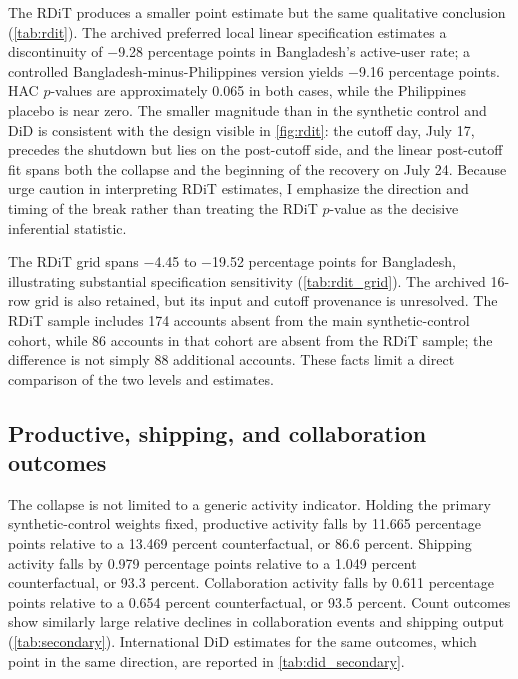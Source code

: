 The RDiT produces a smaller point estimate but the same qualitative conclusion (\cref{tab:rdit}). The archived preferred local linear specification estimates a discontinuity of $-$9.28 percentage points in Bangladesh's active-user rate; a controlled Bangladesh-minus-Philippines version yields $-$9.16 percentage points. HAC $p$-values are approximately 0.065 in both cases, while the Philippines placebo is near zero. The smaller magnitude than in the synthetic control and DiD is consistent with the design visible in \cref{fig:rdit}: the cutoff day, July 17, precedes the shutdown but lies on the post-cutoff side, and the linear post-cutoff fit spans both the collapse and the beginning of the recovery on July 24.
Because \citet{hausman2018} urge caution in interpreting RDiT estimates, I emphasize the direction and timing of the break rather than treating the RDiT $p$-value as the decisive inferential statistic.



The RDiT grid spans $-$4.45 to $-$19.52 percentage points for Bangladesh, illustrating substantial specification sensitivity (\cref{tab:rdit_grid}). The archived 16-row grid is also retained, but its input and cutoff provenance is unresolved. The RDiT sample includes 174 accounts absent from the main synthetic-control cohort, while 86 accounts in that cohort are absent from the RDiT sample; the difference is not simply 88 additional accounts. These facts limit a direct comparison of the two levels and estimates.

\subsection{Productive, shipping, and collaboration outcomes}
\label{sec:secondary}

The collapse is not limited to a generic activity indicator. Holding the primary synthetic-control weights fixed, productive activity falls by 11.665 percentage points relative to a 13.469 percent counterfactual, or 86.6 percent. Shipping activity falls by 0.979 percentage points relative to a 1.049 percent counterfactual, or 93.3 percent. Collaboration activity falls by 0.611 percentage points relative to a 0.654 percent counterfactual, or 93.5 percent. Count outcomes show similarly large relative declines in collaboration events and shipping output (\cref{tab:secondary}). International DiD estimates for the same outcomes, which point in the same direction, are reported in \cref{tab:did_secondary}.

